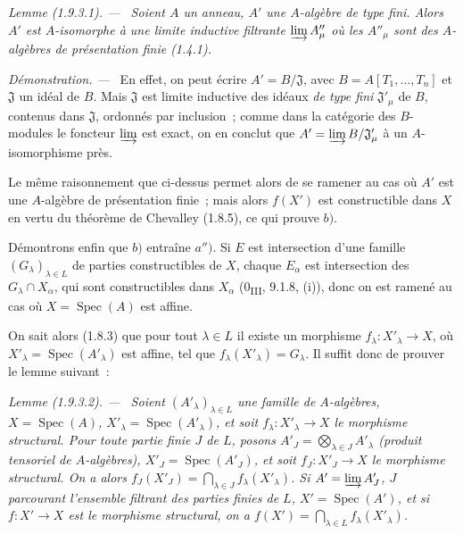 \documentclass[10pt,oneside]{book}
\makeatletter
\newcommand{\setmanualcurrentlabel}[1]{\def\@currentlabel{#1}}
\newenvironment{lemma}[1][]{%
  \setmanualcurrentlabel{#1}\par\medskip\noindent\itshape Lemme (#1). ---\ }{\par}
\newenvironment{proof}{%
  \par\medskip\noindent\textit{Démonstration. ---\ }}{\par}
\makeatother
\begin{document}
\begin{lemma}[1.9.3.1]
\label{IV.1.9.3.1-fr}
Soient $A$ un anneau, $A'$ une $A$-algèbre de type fini. Alors $A'$ est
$A$-isomorphe à une limite inductive filtrante $\varinjlim A''_\mu$ où les
$A''_\mu$ sont des $A$-algèbres de présentation finie (1.4.1).
\end{lemma}

\begin{proof}
En effet, on peut écrire $A'=B/\mathfrak J$, avec
$B=A[T_1,\ldots,T_n]$ et $\mathfrak J$ un idéal de $B$. Mais $\mathfrak J$
est limite inductive des idéaux \emph{de type fini} $\mathfrak J'_\mu$ de
$B$, contenus dans $\mathfrak J$, ordonnés par inclusion~; comme dans la
catégorie des $B$-modules le foncteur $\varinjlim$ est exact, on en conclut
que $A'=\varinjlim B/\mathfrak J'_\mu$ à un $A$-isomorphisme près.
\end{proof}

Le même raisonnement que ci-dessus permet alors de se ramener au cas où $A'$
est une $A$-algèbre de présentation finie~; mais alors $f(X')$ est
constructible dans $X$ en vertu du théorème de Chevalley (1.8.5), ce qui
prouve $b)$.

Démontrons enfin que $b)$ entraîne $a'')$. Si $E$ est intersection d'une
famille $(G_\lambda)_{\lambda\in L}$ de parties constructibles de $X$,
chaque $E_\alpha$ est intersection des $G_\lambda\cap X_\alpha$, qui sont
constructibles dans $X_\alpha$ (0\textsubscript{III}, 9.1.8, (i)), donc on
est ramené au cas où $X=\operatorname{Spec}(A)$ est affine.

On sait alors (1.8.3) que pour tout $\lambda\in L$ il existe un morphisme
$f_\lambda:X'_\lambda\to X$, où
$X'_\lambda=\operatorname{Spec}(A'_\lambda)$ est affine, tel que
$f_\lambda(X'_\lambda)=G_\lambda$. Il suffit donc de prouver le lemme
suivant~:

\begin{lemma}[1.9.3.2]
\label{IV.1.9.3.2-fr}
Soient $(A'_\lambda)_{\lambda\in L}$ une famille de $A$-algèbres,
$X=\operatorname{Spec}(A)$, $X'_\lambda=\operatorname{Spec}(A'_\lambda)$,
et soit $f_\lambda:X'_\lambda\to X$ le morphisme structural. Pour toute
partie finie $J$ de $L$, posons
$A'_J=\bigotimes_{\lambda\in J}A'_\lambda$ (produit tensoriel de
$A$-algèbres), $X'_J=\operatorname{Spec}(A'_J)$, et soit $f_J:X'_J\to X$ le
morphisme structural. On a alors
$f_J(X'_J)=\bigcap_{\lambda\in J}f_\lambda(X'_\lambda)$. Si
$A'=\varinjlim A'_J$, $J$ parcourant l'ensemble filtrant des parties finies
de $L$, $X'=\operatorname{Spec}(A')$, et si $f:X'\to X$ est le morphisme
structural, on a $f(X')=\bigcap_{\lambda\in L}f_\lambda(X'_\lambda)$.
\end{lemma}
\end{document}
